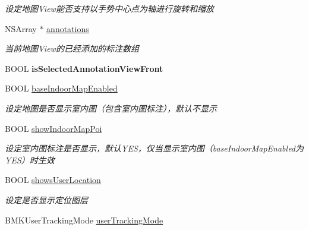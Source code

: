 \begin{DoxyCompactItemize}
\begin{DoxyCompactList}\small\item\em 设定地图\+View能否支持以手势中心点为轴进行旋转和缩放 \end{DoxyCompactList}\item 
\hypertarget{interface_b_m_k_map_view_a61bc5de820abcf06bf3792c933f3e618}{}N\+S\+Array $\ast$ \hyperlink{interface_b_m_k_map_view_a61bc5de820abcf06bf3792c933f3e618}{annotations}\label{interface_b_m_k_map_view_a61bc5de820abcf06bf3792c933f3e618}

\begin{DoxyCompactList}\small\item\em 当前地图\+View的已经添加的标注数组 \end{DoxyCompactList}\item 
\hypertarget{interface_b_m_k_map_view_a5907ada55d984353e2af6c510a334810}{}B\+O\+O\+L {\bfseries is\+Selected\+Annotation\+View\+Front}\label{interface_b_m_k_map_view_a5907ada55d984353e2af6c510a334810}

\item 
\hypertarget{interface_b_m_k_map_view_a3113144328807fd2ee01b59a0035196f}{}B\+O\+O\+L \hyperlink{interface_b_m_k_map_view_a3113144328807fd2ee01b59a0035196f}{base\+Indoor\+Map\+Enabled}\label{interface_b_m_k_map_view_a3113144328807fd2ee01b59a0035196f}

\begin{DoxyCompactList}\small\item\em 设定地图是否显示室内图（包含室内图标注），默认不显示 \end{DoxyCompactList}\item 
\hypertarget{interface_b_m_k_map_view_a005cb41e2eba8f1ea0907515b2f0c1b0}{}B\+O\+O\+L \hyperlink{interface_b_m_k_map_view_a005cb41e2eba8f1ea0907515b2f0c1b0}{show\+Indoor\+Map\+Poi}\label{interface_b_m_k_map_view_a005cb41e2eba8f1ea0907515b2f0c1b0}

\begin{DoxyCompactList}\small\item\em 设定室内图标注是否显示，默认\+Y\+E\+S，仅当显示室内图（base\+Indoor\+Map\+Enabled为\+Y\+E\+S）时生效 \end{DoxyCompactList}\item 
\hypertarget{interface_b_m_k_map_view_a6e18e9532c42e940eca7739378348af4}{}B\+O\+O\+L \hyperlink{interface_b_m_k_map_view_a6e18e9532c42e940eca7739378348af4}{shows\+User\+Location}\label{interface_b_m_k_map_view_a6e18e9532c42e940eca7739378348af4}

\begin{DoxyCompactList}\small\item\em 设定是否显示定位图层 \end{DoxyCompactList}\item 
\hypertarget{interface_b_m_k_map_view_aac0adfff30441312452cef6844ef818b}{}B\+M\+K\+User\+Tracking\+Mode \hyperlink{interface_b_m_k_map_view_aac0adfff30441312452cef6844ef818b}{user\+Tracking\+Mode}\label{interface_b_m_k_map_view_aac0adfff30441312452cef6844ef818b}


\end{DoxyCompactItemize}
